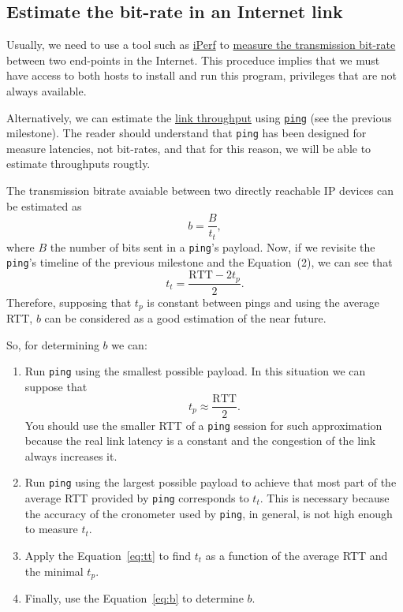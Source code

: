 \subsection{Estimate the bit-rate in an Internet link}

Usually, we need to use a tool such as \href{https://iperf.fr/}{iPerf}
to
\href{https://en.wikipedia.org/wiki/Measuring_network_throughput}{measure
  the transmission bit-rate} between two end-points in the
Internet. This proceduce implies that we must have access to both
hosts to install and run this program, privileges that are not always
available.

Alternatively, we can estimate the
\href{https://en.wikipedia.org/wiki/Throughput}{link throughput} using
\href{https://github.com/torvalds/linux/blob/master/net/ipv4/ping.c}{\texttt{ping}}
(see the previous milestone). The reader should understand that
\texttt{ping} has been designed for measure latencies, not bit-rates,
and that for this reason, we will be able to estimate throughputs
rougtly.

The transmission bitrate avaiable between two directly reachable IP
devices can be estimated as
\begin{equation}
  b=\frac{B}{t_t},
  \label{eq:b}
\end{equation}
where $B$ the number of bits sent in a \texttt{ping}'s payload. Now,
if we revisite the \texttt{ping}'s timeline of the previous milestone
and the Equation~(2), we can see that
\begin{equation}
  t_t = \frac{\text{RTT}-2t_p}{2}.
  \label{eq:tt}
\end{equation}
Therefore, supposing that $t_p$ is constant between pings and using
the average RTT, $b$ can be considered as a good estimation of the
near future.

So, for determining $b$ we can:
\begin{enumerate}
\item Run \texttt{ping} using the smallest possible payload. In this
  situation we can suppose that
  \begin{equation}
    t_p \approx \frac{\text{RTT}}{2}.
    \label{eq:tp}
  \end{equation}
  You should use the smaller RTT of a \texttt{ping} session for such
  approximation because the real link latency is a constant and the
  congestion of the link always increases it.
\item Run \texttt{ping} using the largest possible payload to achieve
  that most part of the average RTT provided by \texttt{ping}
  corresponds to $t_t$. This is necessary because the accuracy of the
  cronometer used by \texttt{ping}, in general, is not high enough to
  measure $t_t$.
\item Apply the Equation~\ref{eq:tt} to find $t_t$ as a function of
  the average RTT and the minimal $t_p$.
\item Finally, use the Equation~\ref{eq:b} to determine $b$.
\end{enumerate}

